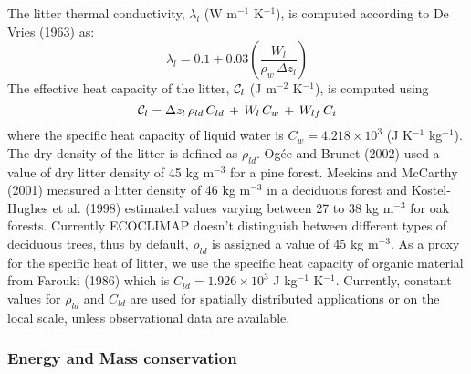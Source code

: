 {The litter thermal conductivity, $\lambda_l$ (W m$^{-1}$ K$^{-1}$),  
is computed according to 
De Vries (1963)\nocite{de1963thermal} as:
%
\begin{equation}
 \lambda_{l} = 0.1 + 0.03 \left(\frac{W_{l}}{\rho_w\,\Delta z_l}\right)
\end{equation}
%
The effective heat capacity of the litter, ${\cal{C}}_l$ 
(J m$^{-2}$ K$^{-1}$),
is computed using
%
\begin{equation}
 {\cal{C}}_l = \Delta z_l \,\rho_{ld}\, C_{ld}
\,+\, W_{l}\,C_w \,+\,  W_{lf}\,C_i
\end{equation}
%
where the specific heat
capacity of liquid water is $C_w=4.218 \times 10^3$ (J K$^{-1}$ kg$^{-1}$).
The dry density of the litter is defined as $\rho_{ld}$. 
Og\'ee and Brunet (2002)\nocite{ogee2002forest} 
used a value of dry litter density
of 45 kg m$^{-3}$ for a pine forest.
Meekins and McCarthy (2001)\nocite{forrest2001effect} 
measured a litter density of 46 kg m$^{-3}$
in a deciduous forest and 
Kostel-Hughes et al. (1998)\nocite{kostel1998forest} 
estimated values
varying between 27 to 38 kg m$^{-3}$ for oak forests. Currently
ECOCLIMAP doesn't distinguish between different types of deciduous trees,
thus by default, $\rho_{ld}$ is assigned a value of 45 kg m$^{-3}$.
%
As a proxy for the specific heat of litter, we use the specific heat
capacity of organic material from 
Farouki (1986)\nocite{farouki1986}
which is $C_{ld}=1.926 \times 10^3$ J kg$^{-1}$ K$^{-1}$.
%
Currently, constant values for $\rho_{ld}$ and $C_{ld}$ are used for
spatially distributed
applications or on the local scale, unless observational data are available.


\subsubsection{Energy and Mass conservation}
\label{app:meb_conservation}

}
